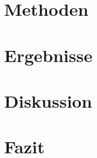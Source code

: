 \documentclass[12pt,a4paper,oneside]{scrartcl}
\begin{document}
\section{Methoden}
\label{sec:methoden}

%

\section{Ergebnisse}
\label{sec:ergebnisse}

%

\section{Diskussion}
\label{sec:diskussion}

%

\section{Fazit}
\label{sec:fazit}

%


%
\newpage


%



\newpage
\appendix

%


\end{document}
